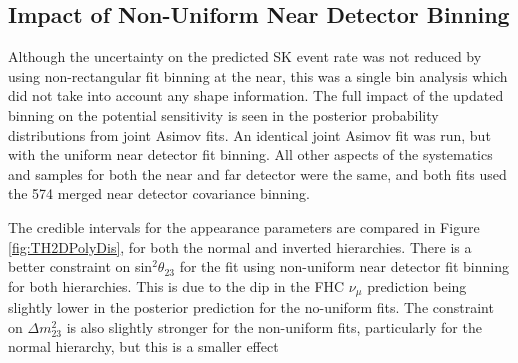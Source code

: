 \subsection{Impact of Non-Uniform Near Detector Binning}\label{sec:jointEb}

Although the uncertainty on the predicted SK event rate was not reduced by using non-rectangular fit binning at the near, this was a single bin analysis which did not take into account any shape information. The full impact of the updated binning on the potential sensitivity is seen in the posterior probability distributions from joint Asimov fits. An identical joint Asimov fit was run, but with the uniform near detector fit binning. All other aspects of the systematics and samples for both the near and far detector were the same, and both fits used the 574 merged near detector covariance binning.

The credible intervals for the appearance parameters are compared in Figure \ref{fig:TH2DPolyDis}, for both the normal and inverted hierarchies. There is a better constraint on sin$^{2}\theta_{23}$ for the fit using non-uniform near detector fit binning for both hierarchies. This is due to the dip in the FHC $\nu_{\mu}$ prediction being slightly lower in the posterior prediction for the no-uniform fits. The constraint on $\Delta m_{23}^{2}$ is also slightly stronger for the non-uniform fits, particularly for the normal hierarchy, but this is a smaller effect

